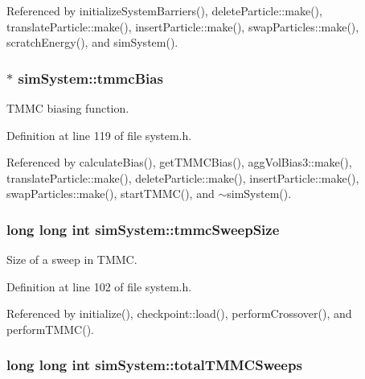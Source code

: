 Referenced by initialize\-System\-Barriers(), delete\-Particle\-::make(), translate\-Particle\-::make(), insert\-Particle\-::make(), swap\-Particles\-::make(), scratch\-Energy(), and sim\-System().

\hypertarget{classsim_system_a13173f45a1e40a5f5a3552b0ebe15b54}{
\subsubsection[{tmmc\-Bias}]{$\ast$ sim\-System\-::tmmc\-Bias}}\label{classsim_system_a13173f45a1e40a5f5a3552b0ebe15b54}


T\-M\-M\-C biasing function. 



Definition at line 119 of file system.\-h.



Referenced by calculate\-Bias(), get\-T\-M\-M\-C\-Bias(), agg\-Vol\-Bias3\-::make(), translate\-Particle\-::make(), delete\-Particle\-::make(), insert\-Particle\-::make(), swap\-Particles\-::make(), start\-T\-M\-M\-C(), and $\sim$sim\-System().

\hypertarget{classsim_system_a56e284a361964d0a9ce5c45f41d56ab1}{
\subsubsection[{tmmc\-Sweep\-Size}]{\setlength{\rightskip}{0pt plus 5cm}long long int sim\-System\-::tmmc\-Sweep\-Size}}\label{classsim_system_a56e284a361964d0a9ce5c45f41d56ab1}


Size of a sweep in T\-M\-M\-C. 



Definition at line 102 of file system.\-h.



Referenced by initialize(), checkpoint\-::load(), perform\-Crossover(), and perform\-T\-M\-M\-C().

\hypertarget{classsim_system_a78b107e20bcbf2f818264fa076de5db3}{
\subsubsection[{total\-T\-M\-M\-C\-Sweeps}]{\setlength{\rightskip}{0pt plus 5cm}long long int sim\-System\-::total\-T\-M\-M\-C\-Sweeps}}\label{classsim_system_a78b107e20bcbf2f818264fa076de5db3}


